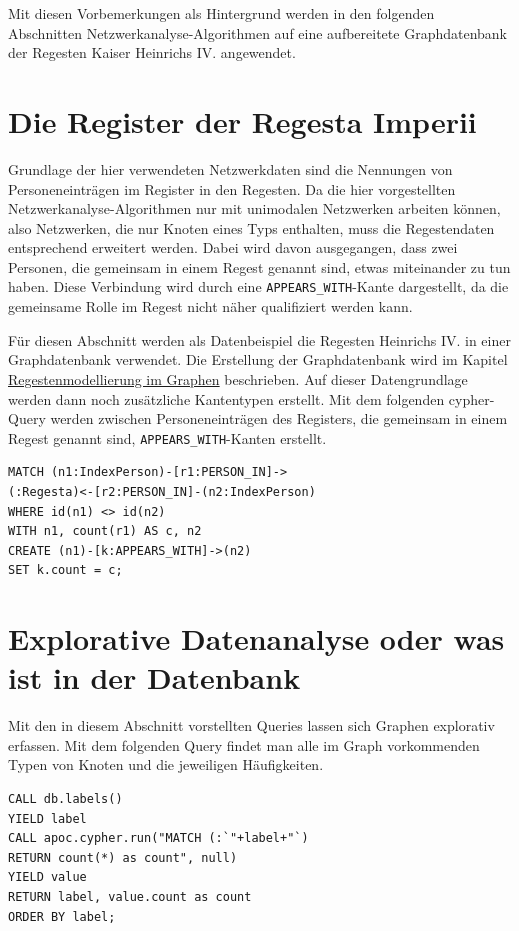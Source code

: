 \documentclass[ngerman,]{scrreprt}
\begin{document}
Mit diesen Vorbemerkungen als Hintergrund werden in den folgenden Abschnitten Netzwerkanalyse-Algorithmen auf eine aufbereitete Graphdatenbank der Regesten Kaiser Heinrichs IV. angewendet.

\section{Die Register der Regesta Imperii}\label{die-register-der-regesta-imperii}

Grundlage der hier verwendeten Netzwerkdaten sind die Nennungen von Personeneinträgen im Register in den Regesten. Da die hier vorgestellten Netzwerkanalyse-Algorithmen nur mit unimodalen Netzwerken arbeiten können, also Netzwerken, die nur Knoten eines Typs enthalten, muss die Regestendaten entsprechend erweitert werden. Dabei wird davon ausgegangen, dass zwei Personen, die gemeinsam in einem Regest genannt sind, etwas miteinander zu tun haben. Diese Verbindung wird durch eine \texttt{APPEARS\_WITH}-Kante dargestellt, da die gemeinsame Rolle im Regest nicht näher qualifiziert werden kann.

Für diesen Abschnitt werden als Datenbeispiel die Regesten Heinrichs IV. in einer Graphdatenbank verwendet. Die Erstellung der Graphdatenbank wird im Kapitel \href{20_Regestenmodellierung-im-Graphen.md}{Regestenmodellierung im Graphen} beschrieben. Auf dieser Datengrundlage werden dann noch zusätzliche Kantentypen erstellt. Mit dem folgenden cypher-Query werden zwischen Personeneinträgen des Registers, die gemeinsam in einem Regest genannt sind, \texttt{APPEARS\_WITH}-Kanten erstellt.

\begin{verbatim}
MATCH (n1:IndexPerson)-[r1:PERSON_IN]->
(:Regesta)<-[r2:PERSON_IN]-(n2:IndexPerson)
WHERE id(n1) <> id(n2)
WITH n1, count(r1) AS c, n2
CREATE (n1)-[k:APPEARS_WITH]->(n2)
SET k.count = c;
\end{verbatim}

\section{Explorative Datenanalyse oder was ist in der Datenbank}\label{explorative-datenanalyse-oder-was-ist-in-der-datenbank}

Mit den in diesem Abschnitt vorstellten Queries lassen sich Graphen explorativ erfassen. Mit dem folgenden Query findet man alle im Graph vorkommenden Typen von Knoten und die jeweiligen Häufigkeiten.

\begin{verbatim}
CALL db.labels()
YIELD label
CALL apoc.cypher.run("MATCH (:`"+label+"`)
RETURN count(*) as count", null)
YIELD value
RETURN label, value.count as count
ORDER BY label;
\end{verbatim}
\end{document}

